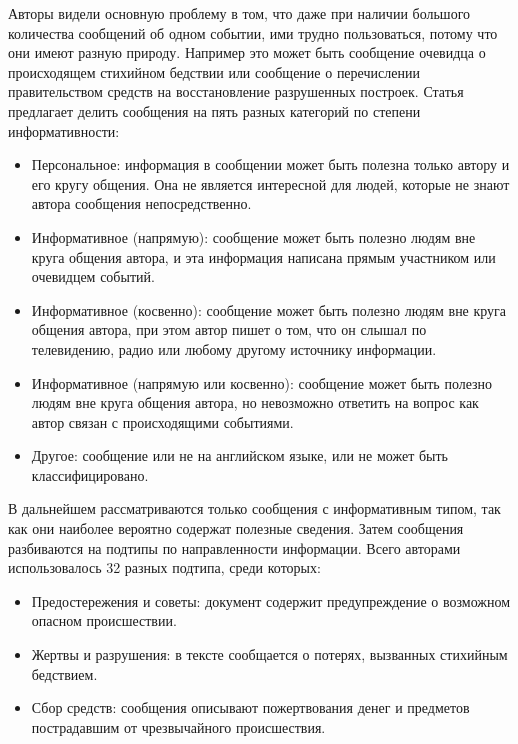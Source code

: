 \documentclass[14pt,a4paper,oneside]{extarticle}
\begin{document}
	Авторы видели основную проблему в том, что даже при наличии большого количества сообщений об одном событии, ими трудно пользоваться, потому что они имеют разную природу. Например это может быть сообщение очевидца о происходящем стихийном бедствии или сообщение о перечислении правительством средств на восстановление разрушенных построек. Статья предлагает делить сообщения на пять разных категорий по степени информативности:
	\begin{itemize}
	\item Персональное:
	информация в сообщении может быть полезна только автору и его кругу общения. Она не является интересной для людей, которые не знают автора сообщения непосредственно.
	\item Информативное (напрямую):
	сообщение может быть полезно людям вне круга общения автора, и эта информация написана прямым участником или очевидцем событий.
	\item Информативное (косвенно):
	сообщение может быть полезно людям вне круга общения автора, при этом автор пишет о том, что он слышал по телевидению, радио или любому другому источнику информации.
	\item Информативное (напрямую или косвенно):
	сообщение может быть полезно людям вне круга общения автора, но невозможно ответить на вопрос как автор связан с происходящими событиями.
	\item Другое:
	сообщение или не на английском языке, или не может быть классифицировано.
	\end{itemize}
	
	В дальнейшем рассматриваются только сообщения с информативным типом, так как они наиболее вероятно содержат полезные сведения. Затем сообщения разбиваются на подтипы по направленности информации. Всего авторами использовалось 32 разных подтипа, среди которых:
	\begin{itemize}
	\item Предостережения и советы: документ содержит предупреждение о возможном опасном происшествии.
	\item Жертвы и разрушения: в тексте сообщается о потерях, вызванных стихийным бедствием.
	\item Сбор средств: сообщения описывают пожертвования денег и предметов пострадавшим от чрезвычайного происшествия.
	\end{itemize}
	
\end{document}
